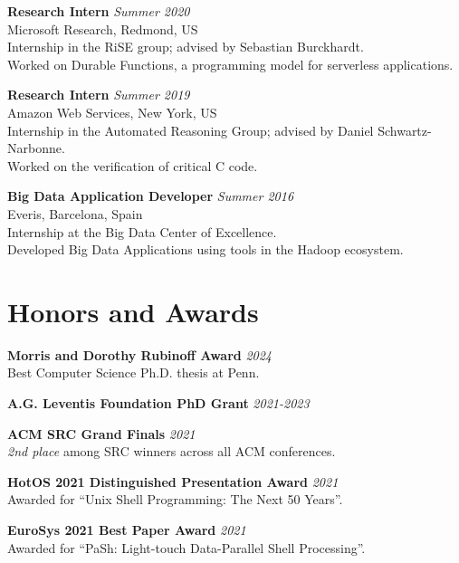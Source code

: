 \documentclass[margin]{res}
\begin{document}
\begin{resume}
\textbf{Research Intern} \hfill {\em Summer 2020} \\
Microsoft Research, Redmond, US \\
Internship in the RiSE group; advised by Sebastian Burckhardt. \\
Worked on Durable Functions, a programming model for serverless applications.

\textbf{Research Intern}  \hfill {\em Summer 2019} \\
Amazon Web Services, New York, US \\
Internship in the Automated Reasoning Group; advised by Daniel Schwartz-Narbonne. \\
Worked on the verification of critical C code.


\textbf{Big Data Application Developer}  \hfill {\em Summer 2016} \\
Everis, Barcelona, Spain \\
Internship at the Big Data Center of Excellence. \\
Developed Big Data Applications using tools in the Hadoop ecosystem.

\section{Honors and Awards}
\hypertarget{sec:honors}{}

\textbf{Morris and Dorothy Rubinoff Award} \hfill {\em 2024} \\
Best Computer Science Ph.D. thesis at Penn.

\textbf{A.G. Leventis Foundation PhD Grant} \hfill {\em 2021-2023}

\textbf{ACM SRC Grand Finals} \hfill {\em 2021} \\
\textit{2nd place} among SRC winners across all ACM conferences.

\textbf{HotOS 2021 Distinguished Presentation Award} \hfill {\em 2021} \\
Awarded for ``Unix Shell Programming: The Next 50 Years''.

\textbf{EuroSys 2021 Best Paper Award} \hfill {\em 2021} \\
Awarded for ``PaSh: Light-touch Data-Parallel Shell Processing''.


\end{resume}
\end{document}
